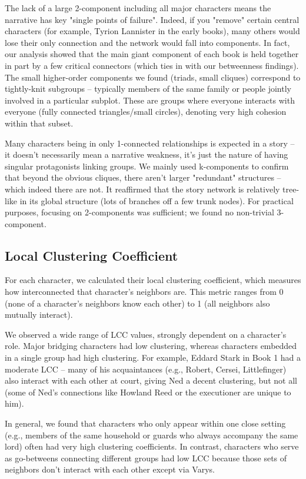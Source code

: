 \documentclass[12pt, a4paper]{article}
\begin{document}
The lack of a large 2-component including all major characters means the narrative has key "single points of failure". Indeed, if you "remove" certain central characters (for example, Tyrion Lannister in the early books), many others would lose their only connection and the network would fall into components. In fact, our analysis showed that the main giant component of each book is held together in part by a few critical connectors (which ties in with our betweenness findings). The small higher-order components we found (triads, small cliques) correspond to tightly-knit subgroups – typically members of the same family or people jointly involved in a particular subplot. These are groups where everyone interacts with everyone (fully connected triangles/small circles), denoting very high cohesion within that subset. 

Many characters being in only 1-connected relationships is expected in a story – it doesn't necessarily mean a narrative weakness, it's just the nature of having singular protagonists linking groups. We mainly used k-components to confirm that beyond the obvious cliques, there aren't larger "redundant" structures – which indeed there are not. It reaffirmed that the story network is relatively tree-like in its global structure (lots of branches off a few trunk nodes). For practical purposes, focusing on 2-components was sufficient; 
we found no non-trivial 3-component.


\subsection*{Local Clustering Coefficient}
For each character, we calculated their local clustering coefficient, which measures how interconnected that character's neighbors are. This metric ranges from 0 (none of a character's neighbors know each other) to 1 (all neighbors also mutually interact). 

We observed a wide range of LCC values, strongly dependent on a character's role. Major bridging characters had low clustering, whereas characters embedded in a single group had high clustering. For example, Eddard Stark in Book 1 had a moderate LCC – many of his acquaintances (e.g., Robert, Cersei, Littlefinger) also interact with each other at court, giving Ned a decent clustering, but not all (some of Ned's connections like Howland Reed or the executioner are unique to him). 

In general, we found that characters who only appear within one close setting (e.g., members of the same household or guards who always accompany the same lord) often had very high clustering coefficients. In contrast, characters who serve as go-betweens connecting different groups had low LCC because those sets of neighbors don't interact with each other except via Varys. 
\end{document}

